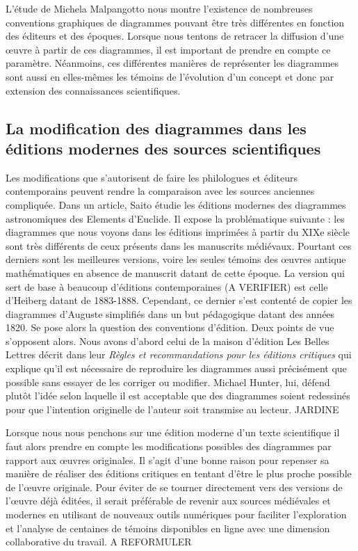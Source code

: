 L'étude de Michela Malpangotto nous montre l'existence de nombreuses conventions graphiques de diagrammes pouvant être très différentes en fonction des éditeurs et des époques. Lorsque nous tentons de retracer la diffusion d'une œuvre à partir de ces diagrammes, il est important de prendre en compte ce paramètre. Néanmoins, ces différentes manières de représenter les diagrammes sont aussi en elles-mêmes les témoins de l'évolution d'un concept et donc par extension des connaissances scientifiques.

\subsection{La modification des diagrammes dans les éditions modernes des sources scientifiques}

Les modifications que s'autorisent de faire les philologues et éditeurs contemporains peuvent rendre la comparaison avec les sources anciennes compliquée. Dans un article, Saito étudie les éditions modernes des diagrammes astronomiques des Elements d'Euclide. Il expose la problématique suivante : les diagrammes que nous voyons dans les éditions imprimées à partir du XIXe siècle sont très différents de ceux présents dans les manuscrits médiévaux. Pourtant ces derniers sont les meilleures versions, voire les seules témoins des œuvres antique mathématiques en absence de manuscrit datant de cette époque. La version qui sert de base à beaucoup d'éditions contemporaines (A VERIFIER) est celle d'Heiberg datant de 1883-1888. Cependant, ce dernier s'est contenté de copier les diagrammes d'Auguste simplifiés dans un but pédagogique datant des années 1820. Se pose alors la question des conventions d'édition. Deux points de vue s'opposent alors. Nous avons d'abord celui de la maison d'édition Les Belles Lettres décrit dans leur \textit{Règles et recommandations pour les éditions critiques} qui explique qu'il est nécessaire de reproduire les diagrammes aussi précisément que possible sans essayer de les corriger ou modifier. Michael Hunter, lui, défend plutôt l'idée selon laquelle il est acceptable que des diagrammes soient redessinés pour que l'intention originelle de l'auteur soit transmise au lecteur. JARDINE

Lorsque nous nous penchons sur une édition moderne d'un texte scientifique il faut alors prendre en compte les modifications possibles des diagrammes par rapport aux œuvres originales. Il s'agit d'une bonne raison pour repenser sa manière de réaliser des éditions critiques en tentant d'être le plus proche possible de l'œuvre originale. Pour éviter de se tourner directement vers des versions de l'œuvre déjà éditées, il serait préférable de revenir aux sources médiévales et modernes en utilisant de nouveaux outils numériques pour faciliter l'exploration et l'analyse de centaines de témoins disponibles en ligne avec une dimension collaborative du travail. A REFORMULER